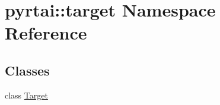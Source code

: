 \hypertarget{namespacepyrtai_1_1target}{
\section{pyrtai\-:\-:target \-Namespace \-Reference}
\label{namespacepyrtai_1_1target}
}
\subsection*{\-Classes}
\begin{DoxyCompactItemize}
\item 
class \hyperlink{classpyrtai_1_1target_1_1_target}{\-Target}
\end{DoxyCompactItemize}
